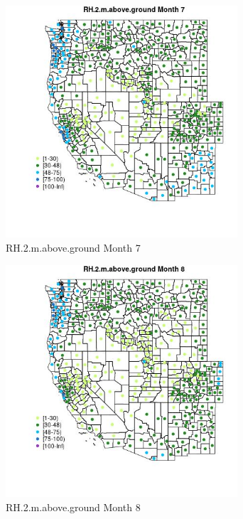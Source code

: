 \begin{figure} 
\centering  
\includegraphics[width=0.77\textwidth]{Code_Outputs/df_report_ML_predictors_CountyCentroid_Locations_Dates_2008-01-01to2018-12-31_MapObsMo7RH2maboveground.jpg} 
\caption{\label{fig:df_report_ML_predictors_CountyCentroid_Locations_Dates_2008-01-01to2018-12-31MapObsMo7RH2maboveground}RH.2.m.above.ground Month 7} 
\end{figure} 
 

\begin{figure} 
\centering  
\includegraphics[width=0.77\textwidth]{Code_Outputs/df_report_ML_predictors_CountyCentroid_Locations_Dates_2008-01-01to2018-12-31_MapObsMo8RH2maboveground.jpg} 
\caption{\label{fig:df_report_ML_predictors_CountyCentroid_Locations_Dates_2008-01-01to2018-12-31MapObsMo8RH2maboveground}RH.2.m.above.ground Month 8} 
\end{figure} 
 

